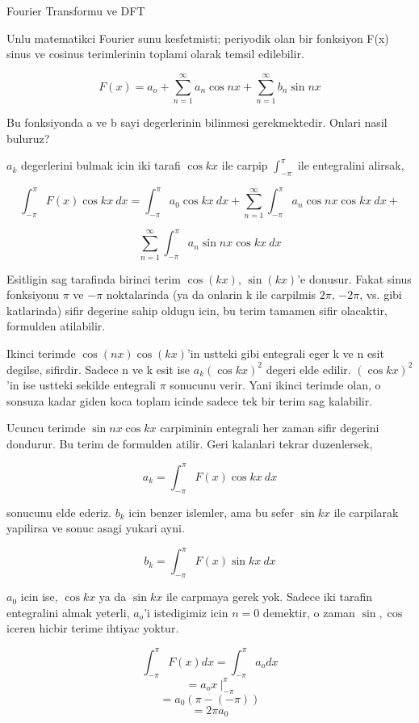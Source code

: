 \documentclass[12pt,fleqn]{article}\usepackage{../common}
\begin{document}
Fourier Transformu ve DFT

Unlu matematikci Fourier sunu kesfetmisti; periyodik olan bir fonksiyon F(x)
sinus ve cosinus terimlerinin toplami olarak temsil edilebilir.

$$ F(x) = a_o + \sum_{n=1}^{\infty}a_n \cos nx + \sum_{n=1}^{\infty}b_n \sin nx  $$

Bu fonksiyonda a ve b sayi degerlerinin bilinmesi gerekmektedir. Onlari nasil
buluruz? 

$a_k$ degerlerini bulmak icin iki tarafi $\cos kx$ ile carpip
$\int_{-\pi}^{\pi}$ ile entegralini alirsak,

$$ \int_{-\pi}^{\pi} F(x)\cos kx \ dx = \int_{-\pi}^{\pi} a_0 \cos
kx \ dx +  \sum_{n=1}^{\infty}\int_{-\pi}^{\pi} a_n \cos nx \cos kx \ dx +   $$

$$ \sum_{n=1}^{\infty}\int_{-\pi}^{\pi} a_n \sin nx \cos kx \ dx   $$

Esitligin sag tarafinda birinci terim $\cos(kx)$, $\sin(kx)$'e donusur. Fakat sinus
fonksiyonu $\pi$ ve $-\pi$ noktalarinda (ya da onlarin k ile carpilmis $2\pi$,
$-2\pi$, vs. gibi katlarinda) sifir degerine sahip oldugu icin, bu terim tamamen
sifir olacaktir, formulden atilabilir.

Ikinci terimde $\cos(nx)\cos(kx)$'in ustteki gibi entegrali eger k ve n esit
degilse, sifirdir. Sadece n ve k esit ise $a_k(\cos kx)^2$ degeri elde edilir.
$(\cos kx)^2$'in ise ustteki sekilde entegrali $\pi$ sonucunu verir. Yani ikinci
terimde olan, o sonsuza kadar giden koca toplam icinde sadece tek bir terim sag
kalabilir.

Ucuncu terimde $\sin nx \cos kx$ carpiminin entegrali her zaman
sifir degerini dondurur. Bu terim de formulden atilir. Geri kalanlari tekrar
duzenlersek, 

$$ a_k = \int_{-\pi}^{\pi} F(x)\cos kx \ dx $$

sonucunu elde ederiz. $b_k$ icin benzer islemler, ama bu sefer $\sin kx$ ile carpilarak yapilirsa ve
sonuc asagi yukari ayni.

$$ b_k = \int_{-\pi}^{\pi} F(x)\sin kx \ dx $$

$a_0$ icin ise, $\cos kx$ ya da $\sin kx$ ile carpmaya gerek yok. Sadece iki
tarafin entegralini almak yeterli, $a_o$'i istedigimiz icin $n=0$ demektir, o
zaman $\sin, \cos$ iceren hicbir terime ihtiyac yoktur.

$$  \int_{-\pi}^{\pi} F(x) dx =  \int_{-\pi}^{\pi} a_o dx $$
$$  =  a_o x \ \bigg|_{-\pi}^{\pi}  $$
$$  = a_0 (\pi -(-\pi))  $$
$$  = 2\pi a_0  $$
\end{document}
